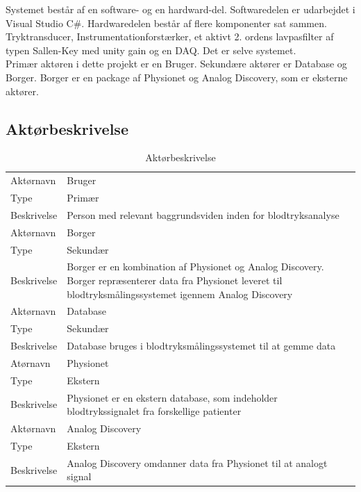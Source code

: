 Systemet består af en software- og en hardward-del. Softwaredelen er udarbejdet i Visual Studio C\#. Hardwaredelen består af flere komponenter sat sammen. Tryktransducer, Instrumentationforstærker, et aktivt 2. ordens lavpasfilter af typen Sallen-Key med unity gain og en DAQ. Det er selve systemet. \\
Primær aktøren i dette projekt er en Bruger. Sekundære aktører er Database og Borger. Borger er en package af Physionet og Analog Discovery, som er eksterne aktører.   

\subsection{Aktørbeskrivelse}

\begin{table}[H]
\begin{tabularx}{\textwidth}{l X}
     Aktørnavn & Bruger \\
     Type & Primær \\
     Beskrivelse  & Person med relevant baggrundsviden inden for blodtryksanalyse \\ 
     \midrule
     Aktørnavn & Borger  \\
     Type & Sekundær \\
     Beskrivelse  & Borger er en kombination af Physionet og Analog Discovery. Borger repræsenterer data fra Physionet leveret til blodtryksmålingssystemet igennem Analog Discovery \\
     \midrule
     Aktørnavn & Database \\
     Type & Sekundær \\
     Beskrivelse  & Database bruges i blodtryksmålingssystemet til at gemme data \\ 
     \midrule
     Atørnavn & Physionet \\
     Type & Ekstern  \\
     Beskrivelse  & Physionet er en ekstern database, som indeholder blodtrykssignalet fra forskellige patienter \\
     \midrule
     Aktørnavn & Analog Discovery  \\
     Type & Ekstern \\
     Beskrivelse  & Analog Discovery omdanner data fra Physionet til at analogt signal \\                                                                                                                                                                          
     \bottomrule                                                                                                                   
    \end{tabularx}
    \caption {Aktørbeskrivelse}
    \label{tab:aktoerbeskrivelse}
	
\end{table}

